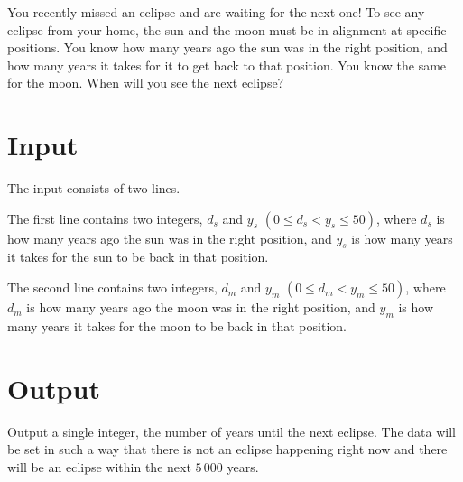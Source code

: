 
You recently missed an eclipse and are waiting for the next one!  To
see any eclipse from your home, the sun and the moon must be in
alignment at specific positions.  You know how many years ago the sun was in the right position, and how many years it takes for it to get back to that position.
You know the same for the moon.
When will you see the next eclipse?

\section*{Input}

The input consists of two lines.

The first line contains two integers, $d_s$ and $y_s$
$(0 \le d_s < y_s \le 50)$, where $d_s$ is how many years ago the sun was in the right position, and $y_s$ is how many years it takes for the sun to be back in that position.

The second line contains two integers, $d_m$ and $y_m$
$(0 \le d_m < y_m \le 50)$, where $d_m$ is how many years ago the moon was in the right position, and $y_m$ is how many years it takes for the moon to be back in that position. 


\section*{Output}

Output a single integer, the number of years until the next
eclipse. The data will be set in such a way that there is not an eclipse happening right now
and there will be an eclipse within the next $5\,000$ years.
